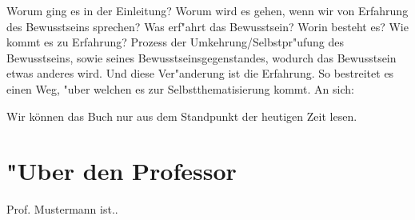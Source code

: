 \documentclass[emulatestandardclasses]{scrartcl}
\begin{document}
Worum ging es in der Einleitung? Worum wird es gehen, wenn wir von Erfahrung des Bewusstseins sprechen? Was erf"ahrt das Bewusstsein? Worin besteht es? Wie kommt es zu Erfahrung? Prozess der Umkehrung/Selbstpr"ufung des Bewusstseins, sowie seines Bewusstseinsgegenstandes, wodurch das Bewusstsein etwas anderes wird. Und diese Ver"anderung ist die Erfahrung. So bestreitet es einen Weg, "uber welchen es zur Selbstthematisierung kommt. An sich: 


Wir können das Buch nur aus dem Standpunkt der heutigen Zeit lesen.



\newpage
\section{"Uber den Professor}
Prof. Mustermann ist..


\end{document}
